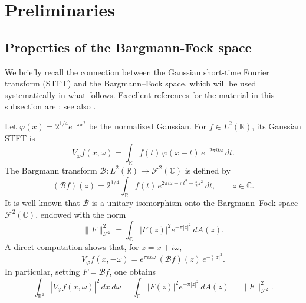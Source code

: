 \section{Preliminaries}\label{sec:preliminaries}

\subsection{Properties of the Bargmann-Fock space} We briefly recall the connection between the Gaussian short-time Fourier transform
(STFT) and the Bargmann--Fock space, which will be used systematically in what
follows. Excellent references for the material in this subsection are
\cite{Bargmann,Folland,Grochenig,Zhu}; see also
\cite{Berezin,Berger-Coburn,Daubechies}.

\medskip

Let $\varphi(x) = 2^{1/4} e^{-\pi x^2}$ be the normalized Gaussian. For $f \in L^2(\mathbb{R})$, its Gaussian STFT is
\begin{equation}\label{eq:STFT}
V_\varphi f(x,\omega)
= \int_{\mathbb{R}} f(t)\, \varphi(x-t)\, e^{-2\pi i t \omega}\, dt.
\end{equation}
The Bargmann transform
$\mathcal{B} : L^2(\mathbb{R}) \to \mathcal{F}^2(\mathbb{C})$ is defined by
\begin{equation}\label{eq:Bargmann}
(\mathcal{B}f)(z)
= 2^{1/4} \int_{\mathbb{R}} f(t)\, e^{2\pi t z - \pi t^2 - \frac{\pi}{2} z^2}\, dt,
\qquad z \in \mathbb{C}.
\end{equation}
It is well known that $\mathcal{B}$ is a unitary isomorphism onto the Bargmann--Fock
space $\mathcal{F}^2(\mathbb{C})$, endowed with the norm
\[
\|F\|_{\mathcal{F}^2}^2
= \int_{\mathbb{C}} |F(z)|^2 e^{-\pi |z|^2} \, dA(z).
\]
A direct computation shows that, for $z = x + i\omega$,
\begin{equation}\label{eq:STFT-B}
V_\varphi f(x,-\omega)
= e^{\pi i x \omega}\, (\mathcal{B}f)(z)\, e^{-\frac{\pi}{2}|z|^2}.
\end{equation}
In particular, setting $F = \mathcal{B}f$, one obtains
\begin{equation}\label{eq:energy}
\int_{\mathbb{R}^2} |V_\varphi f(x,\omega)|^2 \, dx\, d\omega
= \int_{\mathbb{C}} |F(z)|^2 e^{-\pi |z|^2} \, dA(z)
= \|F\|_{\mathcal{F}^2}^2.
\end{equation}

\medskip

\noindent
